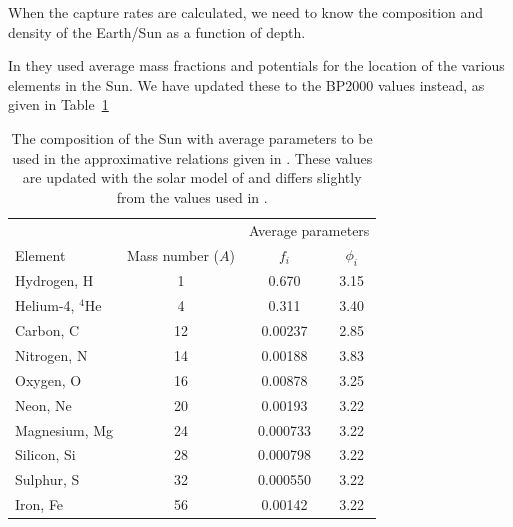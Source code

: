 \documentclass[a4paper,10pt,oneside]{book}
\begin{document}
When the capture rates are calculated, we need to know the composition
and density of the Earth/Sun as a function of depth.  

In \cite{Jungman:1995df} they used average mass fractions and potentials for the
location of the various elements in the Sun. We have updated these to
the BP2000 \cite{Bahcall:2000nu} values instead, as given in Table~\ref{tab:suncomp}

\begin{table}
  \centering
  \begin{tabular}{lccc}
   & & \multicolumn{2}{c}{Average parameters} \\ \cline{3-4}
   Element & Mass number ($A$) & $f_i$ & $\phi_i$ \\ \hline
   Hydrogen, H       &  1 & 0.670    & 3.15 \\
   Helium-4, $^4$He  &  4 & 0.311    & 3.40 \\
   Carbon, C         & 12 & 0.00237  & 2.85 \\
   Nitrogen, N       & 14 & 0.00188  & 3.83 \\
   Oxygen, O         & 16 & 0.00878  & 3.25 \\
   Neon, Ne          & 20 & 0.00193  & 3.22 \\
   Magnesium, Mg     & 24 & 0.000733 & 3.22 \\
   Silicon, Si       & 28 & 0.000798 & 3.22 \\
   Sulphur, S        & 32 & 0.000550 & 3.22 \\
   Iron, Fe          & 56 & 0.00142  & 3.22 \\ \hline
\end{tabular}
\caption{The composition of the Sun with average parameters to be used
  in the approximative relations given in \cite{Jungman:1995df}. These values are
  updated with the solar model of \cite{Bahcall:2000nu} and differs slightly
  from the values used in \cite{Jungman:1995df}.}
  \label{tab:suncomp}
\end{table}
\end{document}
